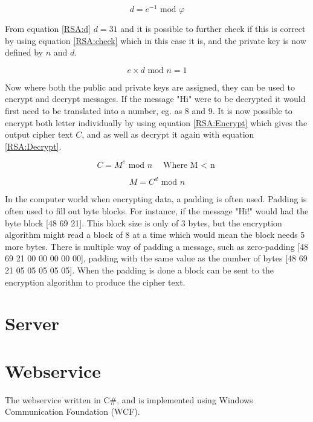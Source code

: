 \begin{equation}
d = e^{-1} \textrm{ mod } \varphi
\label{RSA:d}
\end{equation}

From equation \ref{RSA:d} $d=31$ and it is possible to further check if this is correct by using equation \ref{RSA:check} which in this case it is, and the private key is now defined by $n$ and $d$.

\begin{equation}
e \times d \textrm{ mod } n = 1
\label{RSA:check}
\end{equation}

Now where both the public and private keys are assigned, they can be used to encrypt and decrypt messages. If the message "Hi" were to be decrypted it would first need to be translated into a number, eg. as 8 and 9. It is now possible to encrypt both letter individually by using equation \ref{RSA:Encrypt} which gives the output cipher text $C$, and as well as decrypt it again with equation \ref{RSA:Decrypt}.

\begin{equation}
C=M^e \textrm{ mod } n \quad \textrm{Where M $<$ n}
\label{RSA:Encrypt}
\end{equation}

\begin{equation}
M=C^d \textrm{ mod } n
\label{RSA:Decrypt}
\end{equation}

In the computer world when encrypting data, a padding is often used. Padding is often used to fill out byte blocks. For instance, if the message "Hi!" would had the byte block [48 69 21]. This block size is only of 3 bytes, but the encryption algorithm might read a block of 8 at a time which would mean the block needs 5 more bytes. There is multiple way of padding a message, such as zero-padding [48 69 21 00 00 00 00 00], padding with the same value as the number of bytes [48 69 21 05 05 05 05 05]\cite{PADDING}. When the padding is done a block can be sent to the encryption algorithm to produce the cipher text.

\section{Server}

\section{Webservice}
The webservice written in C\#, and is implemented using Windows Communication Foundation (WCF). 

